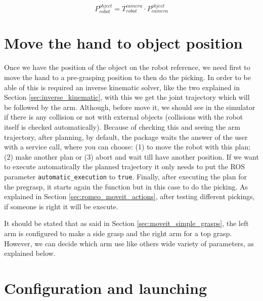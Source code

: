 \documentclass[12pt,a4paper,final,twoside,openright]{report}
\begin{document}
\begin{equation}
P_{robot}^{object} = T_{robot}^{camera} \cdot P_{camera}^{object} \label{eq:pos_robot_object}
\end{equation}


\section{Move the hand to object position}
\label{sec:design_move_hand}

Once we have the position of the object on the robot reference, we need first to move the hand to a pre-grasping position to then do the picking. In order to be able of this is required an inverse kinematic solver, like the two explained in Section \ref{sec:inverse_kinematic}, with this we get the joint trajectory which will be followed by the arm. Although, before move it, we should see in the simulator if there is any collision or not with external objects (collisions with the robot itself is checked automatically). Because of checking this and seeing the arm trajectory, after planning, by default, the package waits  the answer of the user with a service call, where you can choose: (1) to move the robot with this plan; (2) make another plan or (3) abort and wait till have another position. If we want to execute automatically the planned trajectory it only needs to put the ROS parameter \texttt{automatic\_execution} to \texttt{true}. Finally, after executing the plan for the pregrasp, it starts again the function but in this case to do the picking. As explained in Section \ref{sec:romeo_moveit_actions}, after testing different pickings, if someone is right it will be execute.

It should be stated that as said in Section \ref{sec:moveit_simple_grasps}, the left arm is configured to make a side grasp and the right arm for a top grasp. However, we can decide which arm use like others wide variety of parameters, as explained below. 

\section{Configuration and launching}
\label{sec:design_config}
\end{document}
